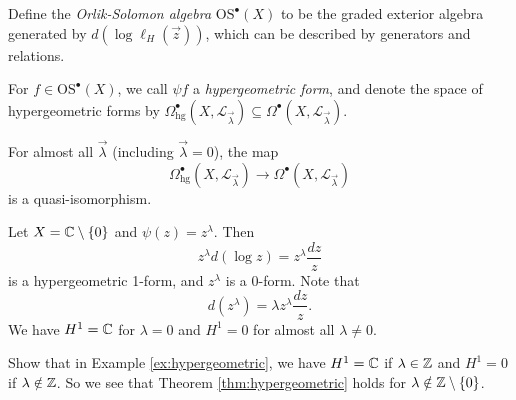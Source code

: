 \begin{definition}
  Define the \emph{Orlik-Solomon algebra}
  $\mathrm{OS}^\bullet(X)$ to be the
  graded exterior algebra generated
  by $d(\log \ell_H(\vec{z}))$,
  which can be described by generators
  and relations.
\end{definition}

\begin{remark}
  For $f \in \mathrm{OS}^\bullet(X)$, we call
  $\psi f$ a \emph{hypergeometric form},
  and denote the space of hypergeometric
  forms by
  $\Omega^\bullet_{\mathrm{hg}}(X, \mathcal{L}_{\vec{\lambda}}) \subseteq \Omega^\bullet(X, \mathcal{L}_{\vec{\lambda}})$.
\end{remark}

\begin{theorem}\label{thm:hypergeometric}
  For almost all $\vec{\lambda}$
  (including $\vec{\lambda} = 0$), the map
  \[
    \Omega^\bullet_{\mathrm{hg}}(X, \mathcal{L}_{\vec{\lambda}})
    \longrightarrow \Omega^\bullet(X, \mathcal{L}_{\vec{\lambda}})
  \]
  is a quasi-isomorphism.
\end{theorem}

\begin{example}\label{ex:hypergeometric}
  Let $X = \mathbb{C} \setminus \{0\}$ and
  $\psi(z) = z^\lambda$. Then
  \[
    z^\lambda d(\log z)
    = z^\lambda \frac{dz}{z}
  \]
  is a hypergeometric 1-form, and
  $z^\lambda$ is a $0$-form.
  Note that
  \[
    d(z^\lambda)
    = \lambda z^{\lambda} \frac{dz}{z}.
  \]
  We have $H^1 = \mathbb{C}$ for
  $\lambda = 0$ and $H^1 = 0$ for
  almost all $\lambda \ne 0$.
\end{example}

\begin{exercise}
  Show that in
  Example \ref{ex:hypergeometric}, we have
  $H^1 = \mathbb{C}$ if $\lambda \in \mathbb{Z}$
  and $H^1 = 0$ if $\lambda \notin \mathbb{Z}$.
  So we see that Theorem
  \ref{thm:hypergeometric}
  holds for
  $\lambda \notin \mathbb{Z} \setminus \{0\}$.
\end{exercise}


